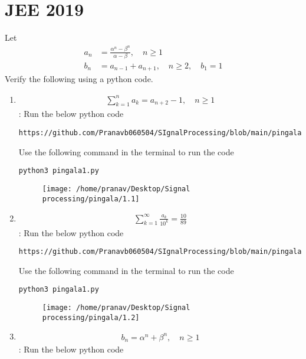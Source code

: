 \documentclass[journal,12pt,twocolumn]{IEEEtran}
\renewcommand\thesection{\arabic{section}}
\begin{document}
\section{JEE 2019}
Let 
\begin{align}
	a_n &= \frac{\alpha^{n}-\beta^{n}}{\alpha - \beta}, \quad n \ge 1
	\\
	b_n &= a_{n-1} + a_{n+1}, \quad n \ge 2, \quad b_1 =1
	\label{eq:10-orig-diff}
\end{align}
Verify the following using a python code.
\begin{enumerate}[label=\thesection.\arabic*
,ref=\thesection.\theenumi]
\item 
\begin{align}
	\sum_{k=1}^{n}a_k = a_{n+2}-1, \quad n \ge 1
\end{align}
\solution:
Run the below python code 
\begin{lstlisting}
https://github.com/Pranavb060504/SIgnalProcessing/blob/main/pingala/codes/pingala1.py
\end{lstlisting}
Use the following command in the terminal to run the code
\begin{lstlisting}
python3 pingala1.py
\end{lstlisting}
\begin{figure}[h]
\centering
\texttt{[image: /home/pranav/Desktop/Signal processing/pingala/1.1]}
\caption{}
\end{figure}
 \item 
\begin{align}
	\sum_{k=1}^{\infty}\frac{a_k}{10^k} =\frac{10}{89}
\end{align}
\solution:
Run the below python code 
\begin{lstlisting}
https://github.com/Pranavb060504/SIgnalProcessing/blob/main/pingala/codes/pingala1.py
\end{lstlisting}
Use the following command in the terminal to run the code
\begin{lstlisting}
python3 pingala1.py
\end{lstlisting}
\begin{figure}[h]
\centering
\texttt{[image: /home/pranav/Desktop/Signal processing/pingala/1.2]}
\caption{}
\end{figure}
 \item 
\begin{align}
	b_n =\alpha^n + \beta^n, \quad n \ge 1
\end{align}
\solution:
Run the below python code 
\begin{lstlisting}

\end{lstlisting}
\end{enumerate}
\end{document}
